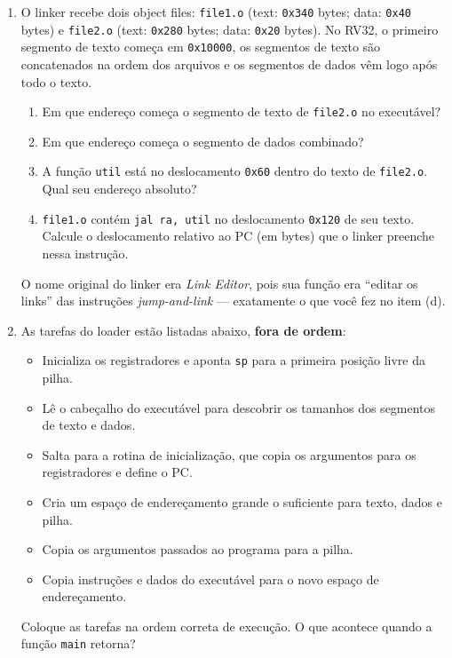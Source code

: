 \documentclass[11pt, a4paper]{article}
\begin{document}
\begin{enumerate}
\item O linker recebe dois object files: \texttt{file1.o} (text: \texttt{0x340} bytes; data: \texttt{0x40} bytes) e \texttt{file2.o} (text: \texttt{0x280} bytes; data: \texttt{0x20} bytes). No RV32, o primeiro segmento de texto come\c{c}a em \texttt{0x10000}, os segmentos de texto s\~{a}o concatenados na ordem dos arquivos e os segmentos de dados v\^{e}m logo ap\'{o}s todo o texto.
\begin{enumerate}
  \item Em que endere\c{c}o come\c{c}a o segmento de texto de \texttt{file2.o} no execut\'{a}vel?
  \item Em que endere\c{c}o come\c{c}a o segmento de dados combinado?
  \item A fun\c{c}\~{a}o \texttt{util} est\'{a} no deslocamento \texttt{0x60} dentro do texto de \texttt{file2.o}. Qual seu endere\c{c}o absoluto?
  \item \texttt{file1.o} cont\'{e}m \texttt{jal ra, util} no deslocamento \texttt{0x120} de seu texto. Calcule o deslocamento relativo ao PC (em bytes) que o linker preenche nessa instru\c{c}\~{a}o.
\end{enumerate}

\begin{curiosidade}
O nome original do linker era \emph{Link Editor}, pois sua fun\c{c}\~{a}o era ``editar os links'' das instru\c{c}\~{o}es \emph{jump-and-link} --- exatamente o que voc\^{e} fez no item (d).
\end{curiosidade}

\item As tarefas do loader est\~{a}o listadas abaixo, \textbf{fora de ordem}:
\begin{itemize}
  \item[\textbf{I.}] Inicializa os registradores e aponta \texttt{sp} para a primeira posi\c{c}\~{a}o livre da pilha.
  \item[\textbf{II.}] L\^{e} o cabe\c{c}alho do execut\'{a}vel para descobrir os tamanhos dos segmentos de texto e dados.
  \item[\textbf{III.}] Salta para a rotina de inicializa\c{c}\~{a}o, que copia os argumentos para os registradores e define o PC.
  \item[\textbf{IV.}] Cria um espa\c{c}o de endere\c{c}amento grande o suficiente para texto, dados e pilha.
  \item[\textbf{V.}] Copia os argumentos passados ao programa para a pilha.
  \item[\textbf{VI.}] Copia instru\c{c}\~{o}es e dados do execut\'{a}vel para o novo espa\c{c}o de endere\c{c}amento.
\end{itemize}
Coloque as tarefas na ordem correta de execu\c{c}\~{a}o. O que acontece quando a fun\c{c}\~{a}o \texttt{main} retorna?


\end{enumerate}
\end{document}
